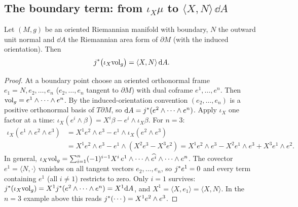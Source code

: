 \subsection{The boundary term: from $\iota_X\mu$ to $\langle X,N\rangle\,\dd A$}\label{sec:boundaryterm}

\begin{lemma}\label{lem:fluxbdry}
Let $(M,g)$ be an oriented Riemannian manifold with boundary, $N$ the outward unit normal and $\dd A$ the Riemannian area form of $\partial M$ (with the induced orientation). Then
\[
j{}^{*}\bigl(\iota_X\mathrm{vol}_g\bigr)=\langle X,N\rangle\,\mathrm{d} A .
\]
\end{lemma}
\begin{proof}
 At a boundary point choose an oriented orthonormal frame $e_1=N,e_2,\dots,e_n$ ($e_2,\dots,e_n$ tangent to $\partial M$) with dual coframe $e^1,\dots,e^n$. Then $\mathrm{vol}_g=e^1\wedge\cdots\wedge e^n$. By the induced-orientation convention $(e_2,\dots,e_n)$ is a positive orthonormal basis of $T\partial M$, so $\mathrm{d} A=j{}^{*}(e^2\wedge\cdots\wedge e^n)$.
 Apply $\iota_X$ one factor at a time: $\iota_X(e^i\wedge\beta)=X^i\beta-e^i\wedge\iota_X\beta$. For $n=3$:
\begin{align*}
\iota_X(e^1\wedge e^2\wedge e^3)&=X^1e^2\wedge e^3-e^1\wedge\iota_X(e^2\wedge e^3)\\
&=X^1e^2\wedge e^3-e^1\wedge(X^2e^3-X^3e^2)=X^1e^2\wedge e^3-X^2e^1\wedge e^3+X^3e^1\wedge e^2 .
\end{align*}
In general, $\iota_X\mathrm{vol}_g=\sum_{i=1}^n(-1)^{i-1}X^i\,e^1\wedge\cdots\wedge\widehat{e^i}\wedge\cdots\wedge e^n$.
 The covector $e^1=\langle N,\cdot\rangle$ vanishes on all tangent vectors $e_2,\dots,e_n$, so $j{}^{*} e^1=0$ and every term containing $e^1$ (all $i\ne1$) restricts to zero. Only $i=1$ survives: $j{}^{*}(\iota_X\mathrm{vol}_g)=X^1j{}^{*}(e^2\wedge\cdots\wedge e^n)=X^1\mathrm{d} A$, and $X^1=\langle X,e_1\rangle=\langle X,N\rangle$. In the $n=3$ example above this reads $j{}^{*}(\cdots)=X^1e^2\wedge e^3$.
\end{proof}
